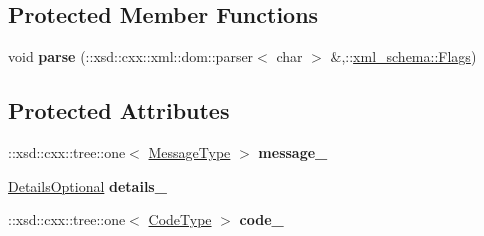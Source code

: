 \subsection*{Protected Member Functions}
\begin{DoxyCompactItemize}
\item 
\hypertarget{classopenstack_1_1xml_1_1CloudServersAPIFault_acd37b9929c1a2941f184cec02646b9c4}{
void {\bfseries parse} (::xsd::cxx::xml::dom::parser$<$ char $>$ \&,::\hyperlink{namespacexml__schema_affb4c227cbd9aa7453dd1dc5a1401943}{xml\_\-schema::Flags})}
\label{classopenstack_1_1xml_1_1CloudServersAPIFault_acd37b9929c1a2941f184cec02646b9c4}

\end{DoxyCompactItemize}
\subsection*{Protected Attributes}
\begin{DoxyCompactItemize}
\item 
\hypertarget{classopenstack_1_1xml_1_1CloudServersAPIFault_a211467f23934966a845e358585da7f24}{
::xsd::cxx::tree::one$<$ \hyperlink{classopenstack_1_1xml_1_1CloudServersAPIFault_aff7b9d2067747fa033a0ea4408011af6}{MessageType} $>$ {\bfseries message\_\-}}
\label{classopenstack_1_1xml_1_1CloudServersAPIFault_a211467f23934966a845e358585da7f24}

\item 
\hypertarget{classopenstack_1_1xml_1_1CloudServersAPIFault_a7e9e79c6340f14068bbea7127161c03a}{
\hyperlink{classopenstack_1_1xml_1_1CloudServersAPIFault_ab0cea94caf240d5baaa0cfe7a5f52758}{DetailsOptional} {\bfseries details\_\-}}
\label{classopenstack_1_1xml_1_1CloudServersAPIFault_a7e9e79c6340f14068bbea7127161c03a}

\item 
\hypertarget{classopenstack_1_1xml_1_1CloudServersAPIFault_a11a0f7a8e895349c10a3dc5b7fadf833}{
::xsd::cxx::tree::one$<$ \hyperlink{classopenstack_1_1xml_1_1CloudServersAPIFault_aa9f350c9dba08ae375b2a61568551550}{CodeType} $>$ {\bfseries code\_\-}}
\label{classopenstack_1_1xml_1_1CloudServersAPIFault_a11a0f7a8e895349c10a3dc5b7fadf833}

\end{DoxyCompactItemize}
